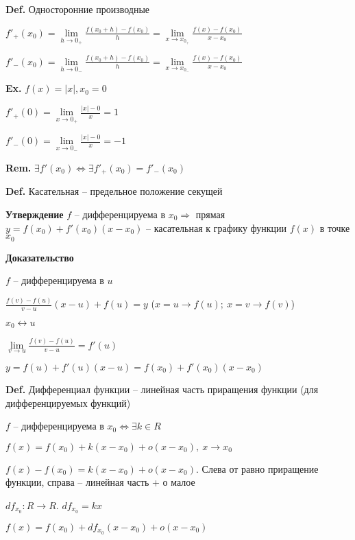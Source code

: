 \documentclass[14pt, letter paper]{article}
\begin{document}
\textbf{Def.} Односторонние производные

$f'_+(x_0) = \lim\limits_{h \rightarrow 0_+} \frac{f(x_0 + h) - f(x_0)}{h} = \lim\limits_{x \rightarrow x_{0_+}} \frac{f(x) - f(x_0)}{x - x_0}$

$f'_-(x_0) = \lim\limits_{h \rightarrow 0_-} \frac{f(x_0 + h) - f(x_0)}{h} = \lim\limits_{x \rightarrow x_{0_-}} \frac{f(x) - f(x_0)}{x - x_0}$

\textbf{Ex.} $f(x) = |x|, x_0 = 0$

$f'_+(0) = \lim\limits_{x \rightarrow 0_+} \frac{|x| - 0}{x} = 1$

$f'_-(0) = \lim\limits_{x \rightarrow 0_-} \frac{|x| - 0}{x} = -1$

\textbf{Rem.} $\exists f'(x_0) \Leftrightarrow \exists f'_+(x_0) = f'_-(x_0)$

\vspace{5mm}

\textbf{Def.} Касательная -- предельное положение секущей

\textbf{Утверждение} $f$ -- дифференцируема в $x_0 \Rightarrow$ прямая $y = f(x_0) + f'(x_0)(x - x_0)$ -- касательная к графику функции $f(x)$ в точке $x_0$ 

\begin{center}
    \textbf{Доказательство}
\end{center}

$f$ -- дифференцируема в $u$

$\frac{f(v) - f(u)}{v - u}(x - u) + f(u) = y$ ($x = u \rightarrow f(u);\ x = v \rightarrow f(v)$)

$x_0 \leftrightarrow u$

$\lim\limits_{v \rightarrow u} \frac{f(v) - f(u)}{v - u} = f'(u)$

$y = f(u) + f'(u)(x - u) = f(x_0) + f'(x_0)(x - x_0)$

\vspace{5mm}

\textbf{Def.} Дифференциал функции -- линейная часть приращения функции (для дифференцируемых функций)

$f$ -- дифференцируема в $x_0 \Leftrightarrow \exists k \in R$

$f(x) = f(x_0) + k(x - x_0) + o(x - x_0),\ x \rightarrow x_0$

$f(x) - f(x_0) = k(x - x_0) + o(x - x_0)$. Слева от равно приращение функции, справа -- линейная часть + о малое

$df_{x_0} : R \rightarrow R$. $df_{x_0} = kx$

$f(x) = f(x_0) + df_{x_0}(x - x_0) + o(x - x_0)$
\end{document}
